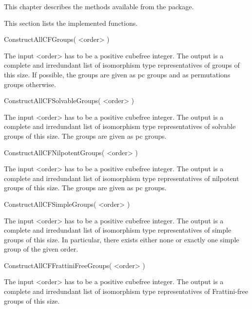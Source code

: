 


This chapter describes the methods available from the {\Cubefree} package.




This section lists the implemented functions.


\>ConstructAllCFGroups( <order> ) 

The input <order> has to be a positive cubefree integer. The output is a complete and irredundant list of isomorphism
type representatives of groups of this size. If possible, the groups are given
as pc groups and as permutations groups otherwise.

\>ConstructAllCFSolvableGroups( <order> ) 

The input <order> has to be a positive cubefree integer. The output is a complete and irredundant list of isomorphism
type representatives of solvable groups of this size. The groups are given as pc groups.

\>ConstructAllCFNilpotentGroups( <order> ) 

The input <order> has to be a positive cubefree integer. The output is a complete and irredundant list of isomorphism
type representatives of nilpotent groups of this size. The groups are given as pc groups.

\>ConstructAllCFSimpleGroups( <order> ) 

The input <order> has to be a positive cubefree integer. The output is a complete and irredundant list of isomorphism
type representatives of simple groups of this size. In particular, there
exists either none or exactly one simple group of the given order.

\>ConstructAllCFFrattiniFreeGroups( <order> ) 

The input <order> has to be a positive cubefree integer. The output is a complete and irredundant list of isomorphism
type representatives of Frattini-free groups of this size.

